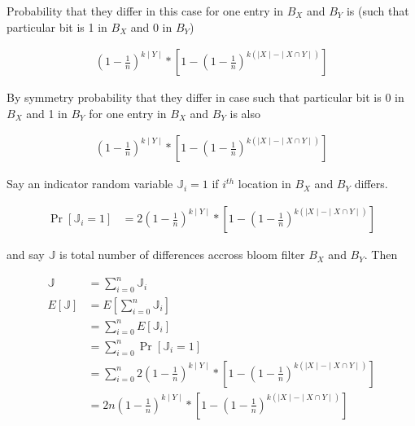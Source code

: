 \documentclass[addpoints,12pt]{exam}
\begin{document}
\begin{questions}
\begin{solution}
            Probability that they differ in this case for one entry in $B_X$ and $B_Y$ is (such that particular bit is 1 in $B_X$ and 0 in $B_Y$)

            \begin{align*}
                \left(1 - \frac{1}{n}\right)^{k \mid Y\mid} * \left[1 - \left(1 - \frac{1}{n}\right)^{k (\mid X\mid - \mid X\cap Y \mid)}\right]
            \end{align*}

            By symmetry probability that they differ in case such that particular bit is 0 in $B_X$ and 1 in $B_Y$ for one entry in $B_X$ and $B_Y$ is also

            \begin{align*}
                \left(1 - \frac{1}{n}\right)^{k \mid Y\mid} * \left[1 - \left(1 - \frac{1}{n}\right)^{k (\mid X\mid - \mid X\cap Y \mid)}\right]
            \end{align*}

            Say an indicator random variable $\mathbb{J}_i = 1$ if $i^{th}$ location in $B_X$ and $B_Y$ differs.

            \begin{align*}
                \Pr[\mathbb{J}_i = 1] &= 2 \left(1 - \frac{1}{n}\right)^{k \mid Y\mid} * \left[1 - \left(1 - \frac{1}{n}\right)^{k (\mid X\mid - \mid X\cap Y \mid)}\right]
            \end{align*}

            and say $\mathbb{J}$ is total number of differences accross bloom filter $B_X$ and $B_Y$. Then

            \begin{align*}
                \mathbb{J} &= \displaystyle\sum_{i = 0} ^{n} \mathbb{J}_i \\
                E[\mathbb{J}] &= E\left[\displaystyle\sum_{i = 0} ^{n} \mathbb{J}_i\right] \\
                &= \displaystyle\sum_{i = 0} ^{n} E[\mathbb{J}_i]\\
                & = \displaystyle\sum_{i = 0} ^{n} \Pr[\mathbb{J}_i = 1]\\
                &= \displaystyle\sum_{i = 0} ^{n} 2 \left(1 - \frac{1}{n}\right)^{k \mid Y\mid} * \left[1 - \left(1 - \frac{1}{n}\right)^{k (\mid X\mid - \mid X\cap Y \mid)}\right]\\
                &= 2n \left(1 - \frac{1}{n}\right)^{k \mid Y\mid} * \left[1 - \left(1 - \frac{1}{n}\right)^{k (\mid X\mid - \mid X\cap Y \mid)}\right]\\
            \end{align*}


\end{solution}
\end{questions}
\end{document}
